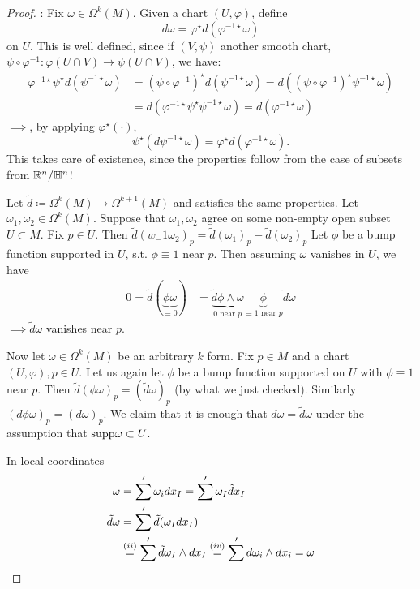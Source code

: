 \begin{proof}
    : Fix \(\omega\in\Omega^k(M)\). Given a  chart \((U,\varphi)\), define \[d\omega=\varphi^\star d(\varphi^{-1\star}\omega)\]
    on \(U\). This is well defined, since 
    if \((V,\psi)\) another smooth chart, \(\psi\circ\varphi^{-1}:\varphi(U\cap V)\to\psi(U\cap V)\), we have:
    \begin{align*}
        \varphi^{-1\star}\psi^\star d(\psi^{-1\star}\omega)&=(\psi\circ \varphi^{-1})^\star d(\psi^{-1\star}\omega)=d((\psi\circ \varphi^{-1})^\star \psi^{-1\star}\omega)\\
        &=d(\varphi^{-1\star} \psi^\star \psi^{-1\star} \omega)=d(\varphi^{-1\star}\omega) 
    \end{align*}
    \(\implies\), by applying \(\varphi^{\star}(\cdot)\), \[\psi^\star(d\psi^{-1\star}\omega)=\varphi^\star d(\varphi^{-1\star}\omega).\]
    This takes care of existence, since the properties follow from the case of subsets from \(\mathbb{R}^n / \mathbb{H}^n\)!

     Let \(\tilde{d}\coloneq \Omega^k(M)\to \Omega^{k+1}(M)\) and satisfies the same properties.
    Let \(\omega_1,\omega_2\in \Omega^k(M)\). Suppose 
    that \(\omega_1,\omega_2\) agree on some non-empty open subset \(U\subset M\). Fix \(p\in U\).
    Then \(\tilde{d}(w_-1\omega_2)_p=\tilde{d}(\omega_1)_p-\tilde{d}(\omega_2)_p\)
    Let \(\phi\) be a bump function supported in \(U\), s.t. \(\phi\equiv1\) near \(p\). Then 
    assuming \(\omega\) vanishes in \(U\), we have 
    \begin{align*}
        0=\tilde{d}(\underbrace{\phi\omega}_{\equiv 0}) &= \underbrace{\tilde{d}\phi \wedge \omega}_{0\text{ near }p}  \underbrace{\phi}_{\equiv 1\text{ near }p} \tilde{d}\omega
    \end{align*}
    \(\implies \tilde{d}\omega\) vanishes near \(p\). 

    Now let \(\omega\in\Omega^k(M)\) be an arbitrary \(k\) form. Fix \(p\in M\) and a chart \((U,\varphi),p\in U\).
    Let us again let \(\phi\) be a bump function supported on \(U\) with \(\phi\equiv 1\) near \(p\).
    Then \(\tilde{d}(\phi\omega)_p=(\tilde{d}\omega)_p\) (by what we just checked). Similarly 
    \((d\phi\omega)_p=(d\omega)_p\). We claim that it is enough that \(d\omega=\tilde{d}\omega\) under the 
    assumption that \(\text{supp} \omega\subset U\). 

    In local coordinates
    \begin{align*}
        \omega &= \sum' \omega_i dx_I=\sum'\omega_I\tilde{d}x_I\\
        \tilde{d}\omega&=\sum' \tilde{d}(\omega_Idx_I)\\
        &\stackrel{(ii)}{=}\sum' \tilde{d}\omega_I\wedge dx_I\stackrel{(iv)}{=}\sum' d\omega_i \wedge dx_i=\omega\qedhere
    \end{align*}
\end{proof}


